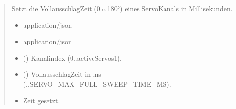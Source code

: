 \documentclass[letterpaper,10pt,english]{sphinxmanual}
\begin{document}
\begin{fulllineitems}
\label{\detokenize{agv_rest_api_pwm:post--api-agv-pwm-channel-setFullSweepTime}}
\pysigstartsignatures
\pysigline
{}
\pysigstopsignatures\begin{quote}\begin{description}
\sphinxAtStartPar
Setzt die Vollausschlag\sphinxhyphen{}Zeit (0↔180°) eines Servo\sphinxhyphen{}Kanals in Millisekunden.

\begin{itemize}
\item {} 
\sphinxAtStartPar
{} \textendash{} application/json

\end{itemize}

\begin{itemize}
\item {} 
\sphinxAtStartPar
{} \textendash{} application/json

\end{itemize}

\begin{itemize}
\item {} 
\sphinxAtStartPar
{} () \textendash{} Kanalindex (0..\textasciigrave{}activeServos\sphinxhyphen{}1\textasciigrave{}).

\item {} 
\sphinxAtStartPar
{} () \textendash{} Vollausschlag\sphinxhyphen{}Zeit in ms (..\textasciigrave{}\textasciigrave{}SERVO\_MAX\_FULL\_SWEEP\_TIME\_MS\textasciigrave{}\textasciigrave{}).

\end{itemize}

\begin{itemize}
\item {} 
\sphinxAtStartPar
{} \textendash{} Zeit gesetzt.


\end{itemize}
\end{description}
\end{quote}
\end{fulllineitems}
\end{document}
